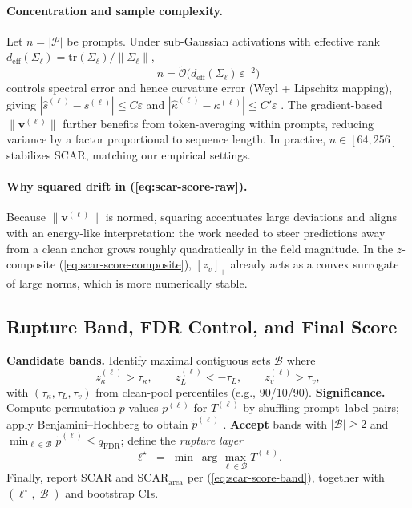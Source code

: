\documentclass[11pt]{article}
\begin{document}
\paragraph{Concentration and sample complexity.}
Let $n=|\mathcal{P}|$ be prompts. Under sub-Gaussian activations with effective rank $d_{\mathrm{eff}}(\Sigma_\ell)=\mathrm{tr}(\Sigma_\ell)/\|\Sigma_\ell\|$,
\[
n=\tilde{\mathcal{O}}\!\big(d_{\mathrm{eff}}(\Sigma_\ell)\,\varepsilon^{-2}\big)
\]
controls spectral error and hence curvature error (Weyl + Lipschitz mapping), giving $|\widehat{s}^{(\ell)}-s^{(\ell)}|\le C\varepsilon$ and $|\widehat{\kappa}^{(\ell)}-\kappa^{(\ell)}|\le C'\varepsilon$ \citep{vershynin2018hdp}. The gradient-based $\|\mathbf{v}^{(\ell)}\|$ further benefits from token-averaging within prompts, reducing variance by a factor proportional to sequence length. In practice, $n\in[64,256]$ stabilizes SCAR, matching our empirical settings.

\paragraph{Why squared drift in (\ref{eq:scar-score-raw}).}
Because $\|\mathbf{v}^{(\ell)}\|$ is normed, squaring accentuates large deviations and aligns with an energy-like interpretation: the work needed to steer predictions away from a clean anchor grows roughly quadratically in the field magnitude. In the $z$-composite (\ref{eq:scar-score-composite}), $[z_v]_+$ already acts as a convex surrogate of large norms, which is more numerically stable.

\vspace{0.6em}
\subsection{Rupture Band, FDR Control, and Final Score}
\label{subsec:scar-fdr}
\textbf{Candidate bands.} Identify maximal contiguous sets $\mathcal{B}$ where
\[
z_\kappa^{(\ell)}>\tau_\kappa,\qquad z_L^{(\ell)}<-\tau_L,\qquad z_v^{(\ell)}>\tau_v,
\]
with $(\tau_\kappa,\tau_L,\tau_v)$ from clean-pool percentiles (e.g., 90/10/90).  
\textbf{Significance.} Compute permutation $p$-values $p^{(\ell)}$ for $T^{(\ell)}$ by shuffling prompt–label pairs; apply Benjamini–Hochberg to obtain $\tilde p^{(\ell)}$ \citep{benjamini1995fdr}.  
\textbf{Accept} bands with $|\mathcal{B}|\ge2$ and $\min_{\ell\in\mathcal{B}}\tilde p^{(\ell)}\le q_{\mathrm{FDR}}$; define the \emph{rupture layer}
\[
\ell^\star\;=\;\min\ \arg\max_{\ell\in\mathcal{B}} T^{(\ell)}.
\]
Finally, report $\mathrm{SCAR}$ and $\mathrm{SCAR}_{\mathrm{area}}$ per (\ref{eq:scar-score-band}), together with $(\ell^\star,|\mathcal{B}|)$ and bootstrap CIs.
\end{document}
